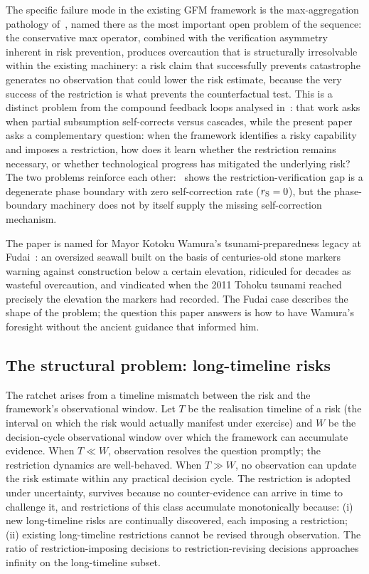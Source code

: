 The specific failure mode in the existing GFM framework is the
max-aggregation pathology of~\citep{lasser2026horizon}, named
there as the most important open problem of the sequence: the
conservative max operator, combined with the verification
asymmetry inherent in risk prevention, produces overcaution that
is structurally irresolvable within the existing machinery: a
risk claim that successfully prevents catastrophe generates no
observation that could lower the risk estimate, because the very
success of the restriction is what prevents the counterfactual
test.  This is a distinct problem from the compound feedback
loops analysed in~\citep{lasser2026phase}: that work asks when
partial subsumption self-corrects versus cascades, while the
present paper asks a complementary question: when the framework
identifies a risky capability and imposes a restriction, how
does it learn whether the restriction remains necessary, or
whether technological progress has mitigated the underlying
risk?  The two problems reinforce each
other:~\citep[Proposition~4]{lasser2026phase} shows the
restriction-verification gap is a degenerate phase boundary with
zero self-correction rate ($r_{\mathrm{S}} = 0$), but the phase-boundary
machinery does not by itself supply the missing self-correction
mechanism.

The paper is named for Mayor Kotoku Wamura's tsunami-preparedness
legacy at Fudai~\citep[Discussion]{lasser2026poset}: an oversized
seawall built on the basis of centuries-old stone markers warning
against construction below a certain elevation, ridiculed for
decades as wasteful overcaution, and vindicated when the 2011 Tohoku
tsunami reached precisely the elevation the markers had recorded.
The Fudai case describes the shape of the problem; the question
this paper answers is how to have Wamura's foresight without the
ancient guidance that informed him.

\subsection{The structural problem: long-timeline risks}

The ratchet arises from a timeline mismatch between the risk and
the framework's observational window.  Let $T$ be the realisation
timeline of a risk (the interval on which the risk would actually
manifest under exercise) and $W$ be the decision-cycle
observational window over which the framework can accumulate
evidence.  When $T \ll W$, observation resolves the question
promptly; the restriction dynamics are well-behaved.  When
$T \gg W$, no observation can update the risk estimate within any
practical decision cycle.  The restriction is adopted under
uncertainty, survives because no counter-evidence can arrive in
time to challenge it, and restrictions of this class accumulate
monotonically because: (i) new long-timeline risks are continually
discovered, each imposing a restriction; (ii) existing long-timeline
restrictions cannot be revised through observation.  The ratio of
restriction-imposing decisions to restriction-revising decisions
approaches infinity on the long-timeline subset.

